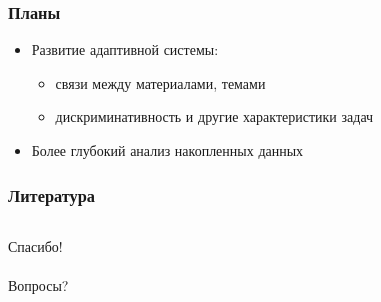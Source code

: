 \documentclass{beamer}
\begin{document}
\begin{frame}\frametitle{Планы}
    \begin{itemize}
        \item Развитие адаптивной системы:
            \begin{itemize}
                \item связи между материалами, темами
                \item дискриминативность и другие характеристики задач
            \end{itemize}
        \bigskip
        \item Более глубокий анализ накопленных данных
    \end{itemize}

\end{frame}


\begin{frame}\frametitle{Литература}
\setmonofont[Mapping=tex-text]{CMU Typewriter Text}


\end{frame}


\begin{frame}

\begin{columns}
      \huge{Спасибо! \\\indent \\\indent Вопросы?}
 \end{columns} 


\end{frame}
\end{document}

